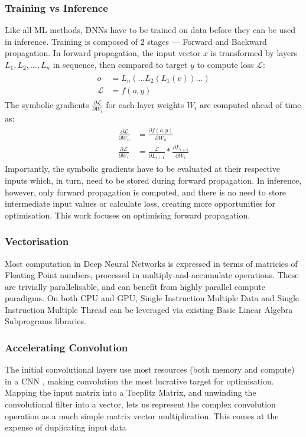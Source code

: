 \documentclass[12pt]{article}
\newcommand{\Loss}{\mathcal{L}}
\begin{document}
\subsubsection{Training vs Inference}
Like all ML methods, DNNs have to be trained on data before they can be used in inference. Training
is composed of 2 stages --- Forward and Backward propagation.
In forward propagation, the input vector $x$ is transformed by layers $L_1, L_2,..., L_n$  in sequence,
then compared to target $y$ to compute loss $\Loss$:
\begin{gather}
\begin{split}
    o &= L_n( ... L_2(L_1(v)) ... )\\
    \Loss &= f(o, y)
\end{split}
\end{gather}
The symbolic gradients $\frac{\partial \Loss}{\partial W_i}$ for each layer weights $W_i$
are computed ahead of time as:
\begin{gather}
\begin{split}
    \frac{\partial \Loss}{\partial W_n} &= \frac{\partial f(o, y)}{\partial W_n}\\
    \frac{\partial \Loss}{\partial W_i} &= \frac{\Loss}{\partial L_{i+1}} * \frac{\partial
    L_{i+1}}{\partial W_i}
\end{split}
\end{gather}
Importantly, the symbolic gradients have to be evaluated at their respective inputs which,
in turn, need to be stored during forward propagation.
In inference, however, only forward propagation is computed, and there is no need to store
intermediate input values or calculate loss, creating more opportunities for optimisation.
This work focuses on optimising forward propagation.


\subsubsection{Vectorisation}
Most computation in Deep Neural Networks is expressed in terms of matricies of Floating Point
numbers, processed in multiply-and-accumulate operations.
These are trivially parallelisable, and can benefit from highly parallel compute
paradigms\cite{sze2017efficient}.
On both CPU and GPU, Single Instruction Multiple Data and Single Instruction Multiple Thread
can be leveraged via existing Basic Linear Algebra Subprograms libraries.

\subsubsection{Accelerating Convolution}
The initial convolutional layers use most resources (both memory and compute) in a CNN \cite{karpathy2015cs231n},
making convolution the most lucrative target for optimisation.
Mapping the input matrix into a Toeplitz Matrix, and unwinding the convolutional filter into a vector,
lets us represent the complex convolution operation as a much simple matrix vector multiplication. This 
comes at the expense of duplicating input data \cite{sze2017efficient}
\end{document}
